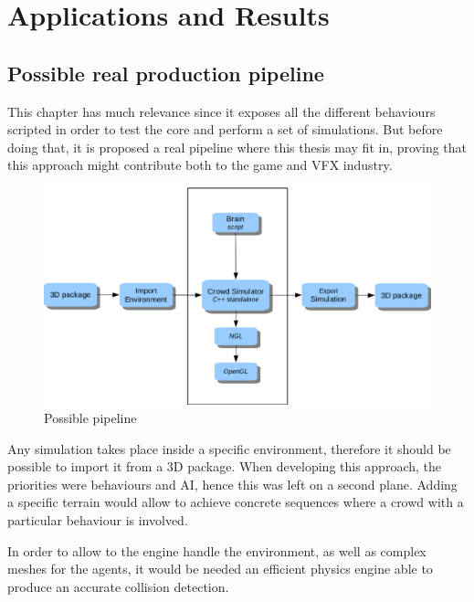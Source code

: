 \ifx\isEmbedded\undefined

\graphicspath{{../img/}}

\fi

\chapter{Applications and Results}
\label{chap:applications_results}

\section{Possible real production pipeline}

This chapter has much relevance since it exposes all the different behaviours scripted in order to test the core and perform a set of simulations. But before doing that, it is proposed a real pipeline where this thesis may fit in, proving that this approach might contribute both to the game and VFX industry.

\begin{figure}[!htb]
  \centering
  \includegraphics[scale=0.5]{pipeline.eps}
  \caption{Possible pipeline}
  \label{fig:classDiag}
\end{figure}

Any simulation takes place inside a specific environment, therefore it should be possible to import it from a 3D package. When developing this approach, the priorities were behaviours and AI, hence this was left on a second plane. Adding a specific terrain would allow to achieve concrete sequences where a crowd with a particular behaviour is involved.

In order to allow to the engine handle the environment, as well as complex meshes for the agents, it would be needed an efficient physics engine able to produce an accurate collision detection. 

